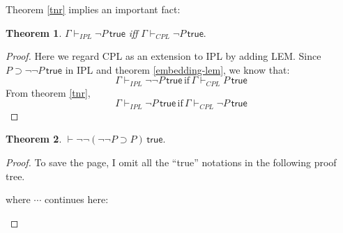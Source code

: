 \documentclass{article}
\theoremstyle{definition}
\newtheorem{theorem}{Theorem}[section]
\newcommand{\true}{\,\textsf{true}}
\begin{document}
Theorem \ref{tnr} implies an important fact:
\begin{theorem}
    $\Gamma \vdash_{IPL} \neg P \true$ \emph{iff} $\Gamma \vdash_{CPL} \neg P \true$.
\end{theorem}
\begin{proof}
    Here we regard CPL as an extension to IPL by adding LEM.
    Since $P\supset \neg\neg P\true$ in IPL and theorem \ref{embedding-lem}, we know that:
    \[
        \Gamma \vdash_{IPL} \neg\neg P\true \, \text{if}\, \Gamma \vdash_{CPL} P\true
    \]
    From theorem \ref{tnr},
    \[
        \Gamma \vdash_{IPL} \neg P\true \, \text{if}\, \Gamma \vdash_{CPL} \neg P\true
    \]
\end{proof}

\begin{theorem}
    $\vdash \neg\neg (\neg\neg P\supset P)\true$.
\end{theorem}
\begin{proof}
    To save the page, I omit all the ``\textsf{true}'' notations in the following proof tree.
    \begin{mathpar}
    \end{mathpar}
    where $\cdots$ continues here:
    \begin{mathpar}

    \end{mathpar}
\end{proof}
\end{document}

